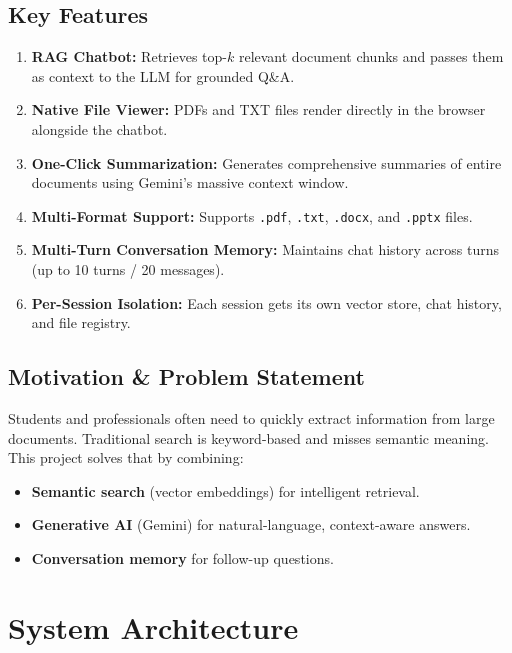 \documentclass[12pt,a4paper]{article}
\begin{document}
\subsection{Key Features}
\begin{enumerate}[leftmargin=1.5cm]
  \item \textbf{RAG Chatbot:} Retrieves top-$k$ relevant document chunks and passes them as context to the LLM for grounded Q\&A.
  \item \textbf{Native File Viewer:} PDFs and TXT files render directly in the browser alongside the chatbot.
  \item \textbf{One-Click Summarization:} Generates comprehensive summaries of entire documents using Gemini's massive context window.
  \item \textbf{Multi-Format Support:} Supports \texttt{.pdf}, \texttt{.txt}, \texttt{.docx}, and \texttt{.pptx} files.
  \item \textbf{Multi-Turn Conversation Memory:} Maintains chat history across turns (up to 10 turns / 20 messages).
  \item \textbf{Per-Session Isolation:} Each session gets its own vector store, chat history, and file registry.
\end{enumerate}

\subsection{Motivation \& Problem Statement}
Students and professionals often need to quickly extract information from large documents. Traditional search is keyword-based and misses semantic meaning. This project solves that by combining:
\begin{itemize}
  \item \textbf{Semantic search} (vector embeddings) for intelligent retrieval.
  \item \textbf{Generative AI} (Gemini) for natural-language, context-aware answers.
  \item \textbf{Conversation memory} for follow-up questions.
\end{itemize}

\section{System Architecture}
\end{document}
